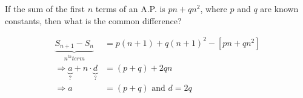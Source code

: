 
%
%
%
%
% 
% 


\question[2] If the sum of the first $n$ terms of an A.P. is $pn + qn^2$, where $p$ 
and $q$ are known constants, then what is the common difference? 


\ifprintanswers
\fi 

\begin{solution}[\mcq]
	\begin{align}
		\underbrace{S_{n+1} - S_n}_{n^{th} term} &= p(n+1) + q(n+1)^2 - [pn + qn^2] \\
		\Rightarrow \underbrace{a}_{?} + n\cdot\underbrace{d}_{?} &= (p+q) + 2qn \\
		\Rightarrow a &= (p+q) \text{ and } d = 2q
	\end{align}
\end{solution}
